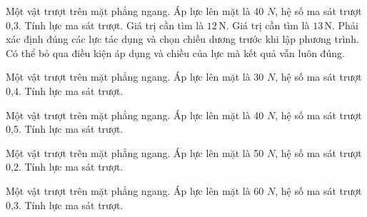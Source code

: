 \begin{ex}
Một vật trượt trên mặt phẳng ngang. Áp lực lên mặt là 40 $N$, hệ số ma sát trượt 0,3. Tính lực ma sát trượt.
\choiceTF
{\True Giá trị cần tìm là $12\,\text{N}$.}
{Giá trị cần tìm là $13\,\text{N}$.}
{\True Phải xác định đúng các lực tác dụng và chọn chiều dương trước khi lập phương trình.}
{Có thể bỏ qua điều kiện áp dụng và chiều của lực mà kết quả vẫn luôn đúng.}
\end{ex}

\begin{ex}
Một vật trượt trên mặt phẳng ngang. Áp lực lên mặt là 30 $N$, hệ số ma sát trượt 0,4. Tính lực ma sát trượt.
\end{ex}

\begin{ex}
Một vật trượt trên mặt phẳng ngang. Áp lực lên mặt là 40 $N$, hệ số ma sát trượt 0,5. Tính lực ma sát trượt.
\end{ex}

\begin{ex}
Một vật trượt trên mặt phẳng ngang. Áp lực lên mặt là 50 $N$, hệ số ma sát trượt 0,2. Tính lực ma sát trượt.
\end{ex}

\begin{ex}
Một vật trượt trên mặt phẳng ngang. Áp lực lên mặt là 60 $N$, hệ số ma sát trượt 0,3. Tính lực ma sát trượt.
\end{ex}

